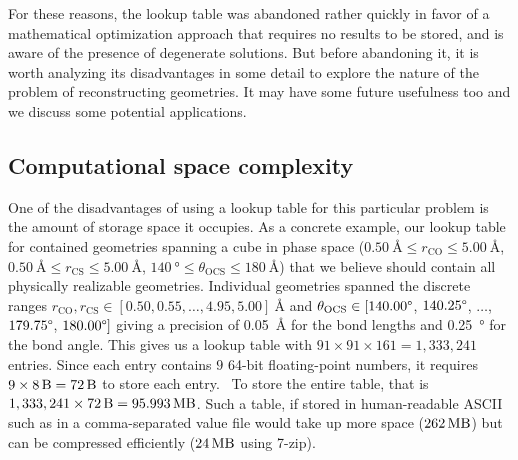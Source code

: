 
For these reasons, the lookup table was abandoned rather quickly in favor of a mathematical optimization approach that requires no results to be stored, and is aware of the presence of degenerate solutions. But before abandoning it, it is worth analyzing its disadvantages in some detail to explore the nature of the problem of reconstructing geometries. It may have some future usefulness too and we discuss some potential applications.

\subsection{Computational space complexity} \label{ssec:LTspace}

One of the disadvantages of using a lookup table for this particular problem is the amount of storage space it occupies.  As a concrete example, our lookup table for  contained geometries spanning a cube in phase space ($\SI{0.50}{\angstrom} \le r_\mathrm{CO} \le \SI{5.00}{\angstrom}$, $\SI{0.50}{\angstrom} \le r_\mathrm{CS} \le \SI{5.00}{\angstrom}$, $\SI{140}{\degree} \le \theta_\mathrm{OCS} \le \SI{180}{\angstrom}$) that we believe should contain all physically realizable geometries. Individual geometries spanned the discrete ranges $r_\mathrm{CO}, r_\mathrm{CS} \in [0.50, 0.55, \dots, 4.95, 5.00] \SI{}{\angstrom}$ and $\theta_\mathrm{OCS} \in [140.00\degree$, $140.25\degree$, $\dots$, $179.75\degree$, $180.00\degree]$ giving a precision of \SI{0.05}{\angstrom} for the bond lengths and \SI{0.25}{\degree} for the bond angle. This gives us a lookup table with $91 \times 91 \times 161 = 1,333,241$ entries. Since each entry contains $9$ 64-bit floating-point numbers, it requires $9 \times \SI{8}{\byte} = \SI{72}{\byte}$ to store each entry.\footnotemark~ To store the entire table, that is $1,333,241 \times \SI{72}{\byte} = \SI{95.993}{\mega\byte}$. Such a table, if stored in human-readable ASCII such as in a comma-separated value file would take up more space ($\SI{262}{\mega\byte}$) but can be compressed efficiently ($\SI{24}{\mega\byte}$ using 7-zip).

